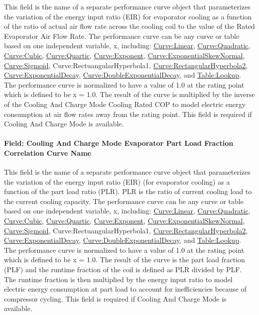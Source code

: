 This field is the name of a separate performance curve object that parameterizes the variation of the energy input ratio (EIR) for evaporator cooling as a function of the ratio of actual air flow rate across the cooling coil to the value of the Rated Evaporator Air Flow Rate. The performance curve can be any curve or table based on one independent variable, x, including: \hyperref[curvelinear]{Curve:Linear}, \hyperref[curvequadratic]{Curve:Quadratic}, \hyperref[curvecubic]{Curve:Cubic}, \hyperref[curvequartic]{Curve:Quartic}, \hyperref[curveexponent]{Curve:Exponent}, \hyperref[curveexponentialskewnormal]{Curve:ExponentialSkewNormal}, \hyperref[curvesigmoid]{Curve:Sigmoid}, Curve:RectuangularHyperbola1, \hyperref[curverectangularhyperbola2]{Curve:RectangularHyperbola2}, \hyperref[curveexponentialdecay]{Curve:ExponentialDecay}, \hyperref[curvedoubleexponentialdecay]{Curve:DoubleExponentialDecay}, and \hyperref[tablelookup]{Table:Lookup}. The performance curve is normalized to have a value of 1.0 at the rating point which is defined to be x = 1.0. The result of the curve is multiplied by the inverse of the Cooling And Charge Mode Cooling Rated COP to model electric energy consumption at air flow rates away from the rating point. This field is required if Cooling And Charge Mode is available.

\paragraph{Field: Cooling And Charge Mode Evaporator Part Load Fraction Correlation Curve Name}\label{field-cooling-and-charge-mode-evaporator-part-load-fraction-correlation-curve-name}

This field is the name of a separate performance curve object that parameterizes the variation of the energy input ratio (EIR) (for evaporator cooling) as a function of the part load ratio (PLR). PLR is the ratio of current cooling load to the current cooling capacity. The performance curve can be any curve or table based on one independent variable, x, including: \hyperref[curvelinear]{Curve:Linear}, \hyperref[curvequadratic]{Curve:Quadratic}, \hyperref[curvecubic]{Curve:Cubic}, \hyperref[curvequartic]{Curve:Quartic}, \hyperref[curveexponent]{Curve:Exponent}, \hyperref[curveexponentialskewnormal]{Curve:ExponentialSkewNormal}, \hyperref[curvesigmoid]{Curve:Sigmoid}, Curve:RectuangularHyperbola1, \hyperref[curverectangularhyperbola2]{Curve:RectangularHyperbola2}, \hyperref[curveexponentialdecay]{Curve:ExponentialDecay}, \hyperref[curvedoubleexponentialdecay]{Curve:DoubleExponentialDecay}, and \hyperref[tablelookup]{Table:Lookup}. The performance curve is normalized to have a value of 1.0 at the rating point which is defined to be x = 1.0. The result of the curve is the part load fraction (PLF) and the runtime fraction of the coil is defined as PLR divided by PLF. The runtime fraction is then multiplied by the energy input ratio to model electric energy consumption at part load to account for inefficiencies because of compressor cycling. This field is required if Cooling And Charge Mode is available.

